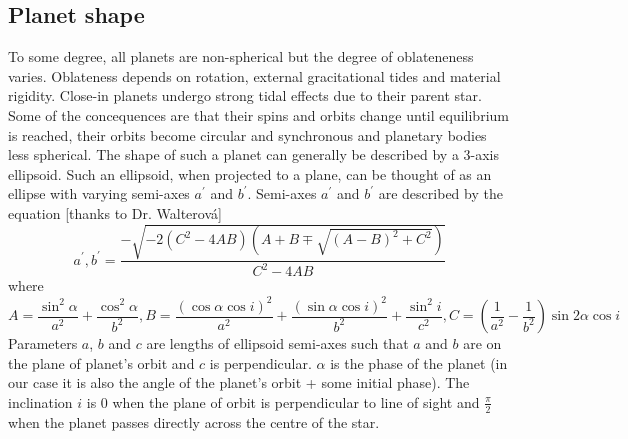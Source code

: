\documentclass[10pt]{article}
\numberwithin{equation}{subsection}
\begin{document}
\subsection{Planet shape}
To some degree, all planets are non-spherical but the degree of oblateneness varies.
Oblateness depends on rotation, external gracitational tides and material rigidity. \cite{carter}
Close-in planets undergo strong tidal effects due to their parent star. Some of the 
concequences are that their spins and orbits change until equilibrium is reached, their
orbits become circular and synchronous and planetary bodies less spherical. \cite{correia1}
The shape of such a planet can generally be described by a 3-axis ellipsoid.
Such an ellipsoid, when projected to a plane, can be thought of as an ellipse with varying
semi-axes $a^{\prime}$ and $b^{\prime}$. Semi-axes $a^{\prime}$ and $b^{\prime}$ 
are described by the equation \cite{correia1} [thanks to Dr. Walterová]
\begin{equation}
  a^{\prime}, b^{\prime} = \frac{-\sqrt{-2(C^2 - 4AB)\left(A + B \mp\sqrt{(A -B)^2 + C^2}\right)}}{C^2 - 4AB}
  \label{eq:semi-axes}
\end{equation}
where 
\begin{equation}
  A = \frac{\sin^2\alpha}{a^2}+\frac{\cos^2\alpha}{b^2}, B = \frac{(\cos\alpha\cos i)^2}{a^2} + \frac{(\sin\alpha\cos i)^2}{b^2} + \frac{\sin^2 i}{c^2}, C = \left(\frac{1}{a^2} - \frac{1}{b^2}\right)\sin 2\alpha\cos i
  \label{eq:ABC}
\end{equation}
Parameters $a$, $b$ and $c$ are lengths of ellipsoid semi-axes such that $a$ and $b$
are on the plane of planet's orbit and $c$ is perpendicular. $\alpha$ is the phase of
the planet (in our case it is also the angle of the planet's orbit + some initial
phase). The inclination $i$ is 0 when the plane of orbit is perpendicular to line of sight
and $\frac{\pi}{2}$ when the planet passes directly across the centre of the star.
\end{document}
